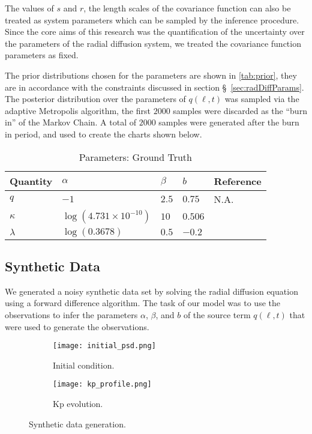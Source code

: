 The values of $s$ and $r$, the length scales of the covariance function can also be treated as 
system parameters which can be sampled by the inference procedure. Since the core aims of this 
research was the quantification of the uncertainty over the parameters of the radial diffusion 
system, we treated the covariance function parameters as fixed.

The prior distributions chosen for the parameters are shown in \cref{tab:prior}, they are in 
accordance with the constraints discussed in section \S~\ref{sec:radDiffParams}. The posterior 
distribution over the parameters of $q(\ell, t)$ was sampled via the adaptive Metropolis algorithm, 
the first $2000$ samples were discarded as the \enquote{burn in} of the Markov Chain. A total of 
$2000$ samples were generated after the burn in period, and used to create the charts shown below.


\begin{table}[ht]
  \caption{Parameters: Ground Truth}
  \label{tab:ground-truth}
  \centering
  \begin{tabular}{lllll}
    \hline
    \textbf{Quantity}  & $\alpha$ & $\beta$ & $b$ & Reference\\
    \hline
    $q$ & $-1$  & $2.5$ & $0.75$ & N.A. \\
    $\kappa$  & $\log(4.731 \times 10^{-10})$ & $10$ & $0.506$ & \citet{JGRA:JGRA15067} \\
    $\lambda$ & $\log(0.3678)$ & $0.5$ & $-0.2$ & \citet{GRL:GRL22815} \\
    \hline
  \end{tabular}
\end{table}

\subsection{Synthetic Data}

We generated a noisy synthetic data set by solving the radial diffusion equation using a 
forward difference algorithm. The task of our model was to use the observations to infer the 
parameters $\alpha$, $\beta$, and $b$ of the source term $q(\ell, t)$ that were used to generate 
the observations.


\begin{figure*}[!htb]
  \centering
  \begin{subfigure}[b]{0.75\textwidth}
    \centering
    \texttt{[image: initial\_psd.png]}
    \caption{ 
      Initial condition.
    }
    \label{fig:initialpsd}
  \end{subfigure}
  \hfill
  \begin{subfigure}[b]{0.75\textwidth}
    \centering
    \texttt{[image: kp\_profile.png]}
    \caption{
      Kp evolution.
    }
    \label{fig:kpProfile}
  \end{subfigure}
  \caption{Synthetic data generation.}
\end{figure*}

